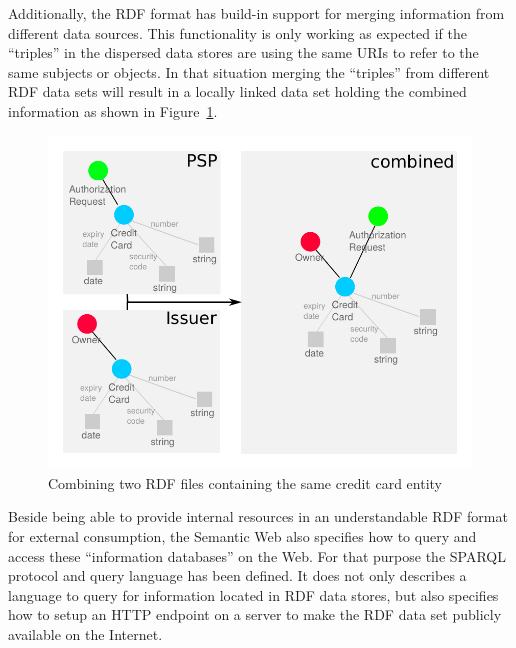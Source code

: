 Additionally, the \gls{RDF} format has build-in support for merging information from different data sources. This functionality is only working as expected if the ``triples'' in the dispersed data stores are using the same \gls{URI}s to refer to the same subjects or objects. In that situation merging the ``triples'' from different \gls{RDF} data sets will result in a locally linked data set holding the combined information as shown in Figure~\ref{fig:images_combine_rdf_graph}. \@

\begin{figure}[H]
	\centering
		\includegraphics[width=0.9\columnwidth]{images/combine_rdf_graph.pdf}
	\caption{Combining two \gls{RDF} files containing the same credit card entity}
\label{fig:images_combine_rdf_graph}
\end{figure}

Beside being able to provide internal resources in an understandable \gls{RDF} format for external consumption, the Semantic Web also specifies how to query and access these ``information databases'' on the Web. For that purpose the \gls{SPARQL} protocol and query language has been defined. It does not only describes a language to query for information located in \gls{RDF} data stores, but also specifies how to setup an \gls{HTTP} endpoint on a server to make the \gls{RDF} data set publicly available on the Internet. \\

